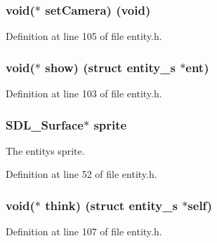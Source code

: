 \subsubsection[{set\+Camera}]{\setlength{\rightskip}{0pt plus 5cm}void($\ast$ set\+Camera) (void)}\label{structentity__s_af4dbc59d08fcac46ed1ea8abadef6cb4}


Definition at line 105 of file entity.\+h.

\hypertarget{structentity__s_a0d1a05278f29fdd42ce786f2baf02f06}{}
\subsubsection[{show}]{\setlength{\rightskip}{0pt plus 5cm}void($\ast$ show) (struct {\bf entity\+\_\+s} $\ast$ent)}\label{structentity__s_a0d1a05278f29fdd42ce786f2baf02f06}


Definition at line 103 of file entity.\+h.

\hypertarget{structentity__s_a1c7252614a33238e51edd3bbd5fa08c5}{}
\subsubsection[{sprite}]{\setlength{\rightskip}{0pt plus 5cm}S\+D\+L\+\_\+\+Surface$\ast$ sprite}\label{structentity__s_a1c7252614a33238e51edd3bbd5fa08c5}


The entity\textquotesingle{}s sprite. 



Definition at line 52 of file entity.\+h.

\hypertarget{structentity__s_ab0cc49e009785df670b0991ef6c7c47e}{}
\subsubsection[{think}]{\setlength{\rightskip}{0pt plus 5cm}void($\ast$ think) (struct {\bf entity\+\_\+s} $\ast$self)}\label{structentity__s_ab0cc49e009785df670b0991ef6c7c47e}


Definition at line 107 of file entity.\+h.

\hypertarget{structentity__s_a7cb2b75bb66761caa1cfd378e8c4d206}{}
